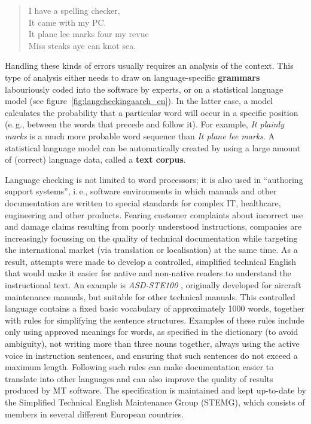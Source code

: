 \documentclass[]{../../metanetpaper}
\begin{document}
\begin{multicols}{2}
\begin{quote}
  I have a spelling checker,\\
  It came with my PC.\\
  It plane lee marks four my revue\\
  Miss steaks aye can knot sea.
\end{quote}

Handling these kinds of errors usually requires an analysis of the context. This type of analysis either needs to draw on language-specific \textbf{grammars} labouriously coded into the software by experts, or on a statistical language model (see figure~\ref{fig:langcheckingaarch_en}). In the latter case, a model calculates the probability that a particular word will occur in a specific position (e.\,g., between the words that precede and follow it). For example, \textit{It plainly marks} is a much more probable word sequence than \textit{It plane lee marks}. A statistical language model can be automatically created by using a large amount of (correct) language data, called a \textbf{text corpus}.

Language checking is not limited to word processors; it is also used in ``authoring support systems'', i.\,e., software environments in which manuals and other documentation are written to special standards for complex IT, healthcare, engineering and other products. Fearing customer complaints about incorrect use and damage claims resulting from poorly understood instructions, companies are increasingly focussing on the quality of technical documentation while targeting the international market (via translation or localisation) at the same time. As a result, attempts were made to develop a controlled, simplified technical English that would make it easier for native and non-native readers to understand the instructional text. An example is \textit{ASD-STE100} \cite{asd}, originally developed for aircraft maintenance manuals, but suitable for other technical manuals.  This controlled language contains a fixed basic vocabulary of approximately 1000 words, together with rules for simplifying the sentence structures. Examples of these rules include only using approved meanings for words, as specified in the dictionary (to avoid ambiguity), not writing more than three nouns together, always using the active voice in instruction sentences, and ensuring that such sentences do not exceed a maximum length. Following such rules can make documentation easier to translate into other languages and can also improve the quality of results produced by MT software. The specification is maintained and kept up-to-date by the Simplified Technical English Maintenance Group (STEMG), which consists of members in several different European countries.


\end{multicols}
\end{document}
